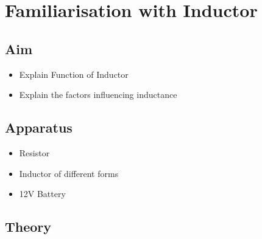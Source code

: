 \chapter{Familiarisation with Inductor}
	\section{Aim}
		\begin{itemize}
			\tightlist
			\item Explain Function of Inductor
			\item Explain the factors influencing inductance
		\end{itemize}
	
	\section{Apparatus}
		\begin{itemize}
			\tightlist
			\item Resistor
			\item Inductor of different forms
			\item 12V Battery
		\end{itemize}	
	
	\section{Theory}
